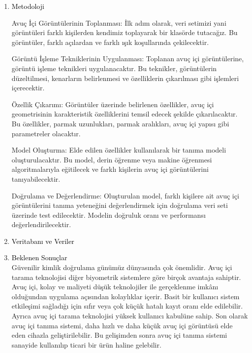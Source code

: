 \documentclass[11pt, a4paper]{article}
\begin{document}
\begin{enumerate}
\begin{enumerate}
	\end{enumerate}
	
	
	
	
	
	\item {\Large\textcolor{black}{Metodoloji}}
	
	Avuç İçi Görüntülerinin Toplanması: İlk adım olarak, veri setimizi yani görüntüleri farklı kişilerden kendimiz toplayarak bir klasörde tutacağız. Bu görüntüler, farklı açılardan ve farklı ışık koşullarında çekilecektir.
	
	Görüntü İşleme Tekniklerinin Uygulanması: Toplanan avuç içi görüntülerine, görüntü işleme teknikleri uygulanacaktır. Bu teknikler, görüntülerin düzeltilmesi, kenarların belirlenmesi ve özelliklerin çıkarılması gibi işlemleri içerecektir.
	
	Özellik Çıkarımı: Görüntüler üzerinde belirlenen özellikler, avuç içi geometrisinin karakteristik özelliklerini temsil edecek şekilde çıkarılacaktır. Bu özellikler, parmak uzunlukları, parmak aralıkları, avuç içi yapısı gibi parametreler olacaktır.
	
	Model Oluşturma: Elde edilen özellikler kullanılarak bir tanıma modeli oluşturulacaktır. Bu model, derin öğrenme veya makine öğrenmesi algoritmalarıyla eğitilecek ve farklı kişilerin avuç içi görüntülerini tanıyabilecektir.
	
	Doğrulama ve Değerlendirme: Oluşturulan model, farklı kişilere ait avuç içi görüntülerini tanıma yeteneğini değerlendirmek için doğrulama veri seti üzerinde test edilecektir. Modelin doğruluk oranı ve performansı değerlendirilecektir.
	
    \item {\Large\textcolor{black}{Veritabanı ve Veriler}} \newline %
	
	
    \item {\Large\textcolor{black}{Beklenen Sonuçlar}}  \\ %
	Güvenilir kimlik doğrulama günümüz dünyasında çok önemlidir. Avuç içi tarama teknolojisi diğer biyometrik sistemlere göre birçok avantaja sahiptir. Avuç içi, kolay ve maliyeti düşük teknolojiler ile gerçeklenme imkânı olduğundan uygulama açısından kolaylıklar içerir. Basit bir kullanıcı sistem etkileşimi sağladığı için sıfır veya çok küçük hatalı kayıt oranı elde edilebilir. Ayrıca avuç içi tarama teknolojisi yüksek kullanıcı kabulüne sahip.  Son olarak avuç içi tanıma sistemi, daha hızlı ve daha küçük avuç içi görüntüsü elde eden cihazla geliştirilebilir.\cite{kumar2006personal} Bu gelişimden sonra avuç içi tanıma sistemi sanayide kullanılıp ticari bir ürün haline gelebilir.
\end{enumerate}	
	  
%

 
\end{document}
